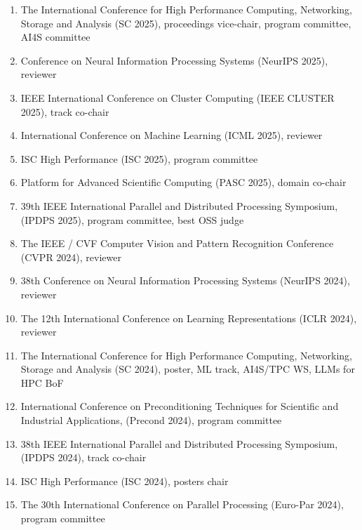 \documentclass[margin,line]{cv}
\begin{document}
\begin{resume}
\begin{enumerate}
\item The International Conference for High Performance Computing, Networking, Storage and Analysis (SC 2025), proceedings vice-chair, program committee, AI4S committee

\item Conference on Neural Information Processing Systems (NeurIPS 2025), reviewer

\item IEEE International Conference on Cluster Computing (IEEE CLUSTER 2025), track co-chair

\item International Conference on Machine Learning (ICML 2025), reviewer

\item ISC High Performance (ISC 2025), program committee

\item Platform for Advanced Scientific Computing (PASC 2025), domain co-chair

\item 39th IEEE International Parallel and Distributed Processing Symposium, (IPDPS 2025), program committee, best OSS judge

\item The IEEE / CVF Computer Vision and Pattern Recognition Conference (CVPR 2024), reviewer

\item 38th Conference on Neural Information Processing Systems (NeurIPS 2024), reviewer

\item The 12th International Conference on Learning Representations (ICLR 2024), reviewer

\item The International Conference for High Performance Computing, Networking, Storage and Analysis (SC 2024), poster, ML track, AI4S/TPC WS, LLMs for HPC BoF

\item International Conference on Preconditioning Techniques for Scientific and Industrial Applications, (Precond 2024), program committee
\item 38th IEEE International Parallel and Distributed Processing Symposium, (IPDPS 2024), track co-chair

\item ISC High Performance (ISC 2024), posters chair

\item The 30th International Conference on Parallel Processing (Euro-Par 2024), program committee


\end{enumerate}
\end{resume}
\end{document}
